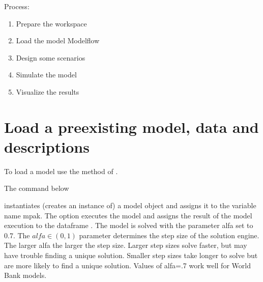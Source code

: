 \documentclass[letterpaper,10pt,english]{jupyterBook}
\begin{document}
\sphinxAtStartPar
Process:
\begin{enumerate}
%
\item {} 
\sphinxAtStartPar
Prepare the workspace

\item {} 
\sphinxAtStartPar
Load the model Modelflow

\item {} 
\sphinxAtStartPar
Design some scenarios

\item {} 
\sphinxAtStartPar
Simulate the model

\item {} 
\sphinxAtStartPar
Visualize the results

\end{enumerate}


\section{Load a pre\sphinxhyphen{}existing model, data and descriptions}
\label{\detokenize{content/06_WBModels/LoadingWBModel:load-a-pre-existing-model-data-and-descriptions}}
\sphinxAtStartPar
To load a model use the  method of .

\sphinxAtStartPar
The command below

\begin{sphinxVerbatim}[commandchars=\\\{\}]
    
\end{sphinxVerbatim}

\sphinxAtStartPar
instantiates (creates an instance of) a model object and assigns it to the variable name mpak.  The  option executes the model and assigns the result of the model execution to the dataframe .  The model is solved with the parameter alfa set to 0.7.  The \(alfa \in (0,1)\) parameter determines the step size of the solution engine. The larger alfa the larger the step size. Larger step sizes solve faster, but may have trouble finding a unique solution.  Smaller step sizes take longer to solve but are more likely to find a unique solution.  Values of alfa=.7 work well for World Bank models.
\end{document}

